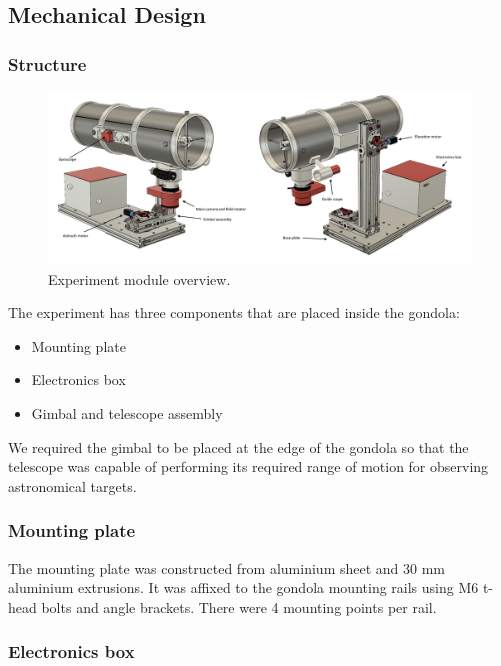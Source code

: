 \newpage
\subsection{Mechanical Design} \label{Mechanical_Design}
\label{sec:mechanical-design}

\subsubsection{Structure}

\begin{figure}[H]
	\centering 
	\includegraphics[scale=0.4]{4-experiment-design/img/mechanical/iso1.png}
	\caption{Experiment module overview.}
	\label{fig::mechanical::iso1}
\end{figure}

\label{sec:4.4.1}
The experiment has three components that are placed inside the gondola:
\begin{itemize}
  \item Mounting plate    
  \item Electronics box
  \item Gimbal and telescope assembly
\end{itemize}

We required the gimbal to be placed at the edge of the gondola so that the telescope was capable of performing its required range of motion for observing astronomical targets.



\subsubsection{Mounting plate}

The mounting plate was constructed from aluminium sheet and 30 mm aluminium extrusions. It was affixed to the gondola mounting rails using M6 t-head bolts and angle brackets. There were 4 mounting points per rail. 

\subsubsection{Electronics box}
\label{sec:4.4.2}

